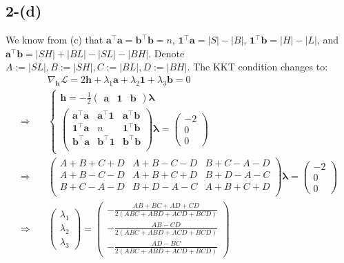 \documentclass[11pt]{article}
\begin{document}
\subsection*{2-(d)}
We know from (c) that $\bm{a}^{\top} \bm{a}=\bm{b}^{\top} \bm{b}=n$, $\bm{1}^{\top} \bm{a}=|S|-|B|$, $\bm{1}^{\top} \bm{b} = |H|-|L|$, and $\bm{a}^{\top} \bm{b} = |SH|+|BL|-|SL|-|BH|$. Denote $A:=|SL|,B:=|SH|,C:=|BL|,D:=|BH|$. The KKT condition changes to:
\begin{equation}
  \begin{split}
    &\nabla_{\bm{h}} \mathcal{L} = 2 \bm{h} + \lambda_1 \bm{a} + \lambda_2 \bm{1} + \lambda_3 \bm{b} = 0 \\
   \Rightarrow \quad &
   \begin{cases}
   \bm{h} = -\frac{1}{2} \begin{pmatrix}
     \bm{a} & \bm{1} & \bm{b} 
   \end{pmatrix} \bm{\lambda}\\
   \begin{pmatrix}
     \bm{a}^{\top} \bm{a} & \bm{a}^{\top} \bm{1} &  \bm{a}^{\top}\bm{b}  \\[1pt]
     \bm{1}^{\top} \bm{a} & n & \bm{1}^{\top} \bm{b}  \\[1pt]
     \bm{b}^{\top} \bm{a} & \bm{b}^{\top} \bm{1} & \bm{b}^{\top} \bm{b}  \\[1pt]
   \end{pmatrix} \bm{\lambda} = \begin{pmatrix}
     -2 \\
     0 \\
    0
   \end{pmatrix}
   \end{cases}\\
   \Rightarrow\quad & \begin{pmatrix}
     A+B+C+D & A+B-C-D &  B+C-A-D  \\[1pt]
     A+B-C-D & A+B+C+D &  B+D-A-C  \\[1pt]
     B+C-A-D & B+D-A-C & A+B+C+D  \\[1pt]
   \end{pmatrix} \bm{\lambda} = \begin{pmatrix}
     -2 \\
     0 \\
    0
   \end{pmatrix}\\
   \Rightarrow \quad & \begin{pmatrix}
     \lambda_1 \\
     \lambda_2 \\
     \lambda_3
   \end{pmatrix} = \begin{pmatrix}
     -\frac{AB+BC+AD+CD}{2(ABC+ABD+ACD+BCD)} \\[2pt]
     -\frac{AB-CD}{2(ABC+ABD+ACD+BCD)}\\[2pt]
      -\frac{AD-BC}{2(ABC+ABD+ACD+BCD)}
   \end{pmatrix}
   \end{split}
   \end{equation}
\end{document}
